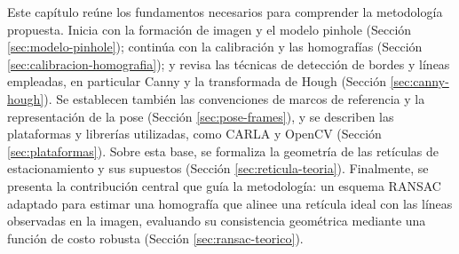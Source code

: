 \noindent
Este capítulo reúne los fundamentos necesarios para comprender la metodología propuesta. Inicia con la formación de imagen y el modelo pinhole (Sección \ref{sec:modelo-pinhole}); continúa con la calibración y las homografías (Sección \ref{sec:calibracion-homografia}); y revisa las técnicas de detección de bordes y líneas empleadas, en particular Canny y la transformada de Hough (Sección \ref{sec:canny-hough}). Se establecen también las convenciones de marcos de referencia y la representación de la pose (Sección \ref{sec:pose-frames}), y se describen las plataformas y librerías utilizadas, como CARLA y OpenCV (Sección \ref{sec:plataformas}). Sobre esta base, se formaliza la geometría de las retículas de estacionamiento y sus supuestos (Sección \ref{sec:reticula-teoria}). Finalmente, se presenta la contribución central que guía la metodología: un esquema RANSAC adaptado para estimar una homografía que alinee una retícula ideal con las líneas observadas en la imagen, evaluando su consistencia geométrica mediante una función de costo robusta (Sección \ref{sec:ransac-teorico}).
